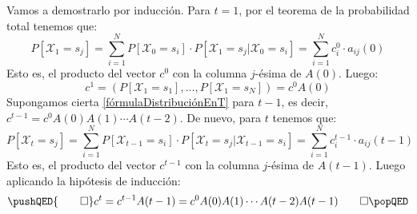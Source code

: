 \begin{proofs*}
Vamos a demostrarlo por inducción. Para $t=1$, por el teorema de la probabilidad total tenemos que:
\[P[\mathcal{X}_1=s_j]=\sum_{i=1}^N P[\mathcal{X}_0=s_i]\cdot P[\mathcal{X}_1=s_j|\mathcal{X}_0=s_i]=\sum_{i=1}^N  c_i^0\cdot a_{ij}(0)\]
Esto es, el producto del vector $c^0$ con la columna $j$-ésima de $A(0)$. Luego:
\[c^1=\left(P[\mathcal{X}_1=s_1],\dots,P[\mathcal{X}_1=s_N]\right)=c^0A(0)\]
Supongamos cierta \eqref{fórmulaDistribuciónEnT} para $t-1$, es decir, $c^{t-1}=c^0A(0)A(1)\cdots A(t-2)$. De nuevo, para $t$ tenemos que:
\[P[\mathcal{X}_t=s_j]=\sum_{i=1}^N P[\mathcal{X}_{t-1}=s_i]\cdot P[\mathcal{X}_t=s_j|\mathcal{X}_{t-1}=s_i]=\sum_{i=1}^N  c_i^{t-1}\cdot a_{ij}(t-1)\]
Esto es, el producto del vector $c^{t-1}$ con la columna $j$-ésima de $A(t-1)$. Luego aplicando la hipótesis de inducción:
\[ \pushQED{\qed}
    c^t= c^{t-1}A(t-1) =c^0A(0)A(1)\cdots A(t-2)A(t-1)\qedhere
    \popQED\]
\end{proofs*}

